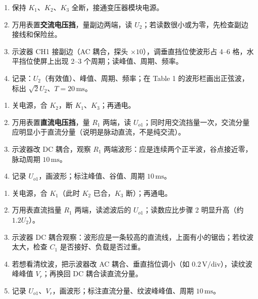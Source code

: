 \documentclass[11pt]{ctexart}
\let\origsubhdr\subhdr
\renewcommand{\subhdr}[1]{\needspace{3\baselineskip}\origsubhdr{#1}}
\begin{document}

\begin{enumerate}
  \item 保持 $K_1$、$K_2$、$K_3$ 全断，接通变压器模块电源。
  \item 万用表置\textbf{交流电压挡}，量副边两端，读 $U_2$；若读数很小或为零，先检查副边接线和保险丝。
  \item 示波器 CH1 接副边（AC 耦合，探头 $\times10$），调垂直挡位使波形占 4--6 格，水平挡位使屏上出现 2--3 个周期；读峰值、周期、频率。
  \item 记录：$U_2$（有效值）、峰值、周期、频率；在 Table 1 的波形栏画出正弦波，标出 $\sqrt2U_2$、$T=20\,\mathrm{ms}$。
\end{enumerate}


\begin{enumerate}
  \item 关电源，合 $K_2$，断 $K_1$、$K_3$；再通电。
  \item 万用表置\textbf{直流电压挡}，量 $R_1$ 两端，读 $U_{o1}$；同时用交流挡量一次，交流分量应明显小于直流分量（说明是脉动直流，不是纯交流）。
  \item 示波器改 DC 耦合，观察 $R_1$ 两端波形：应是连续两个正半波，谷点接近零，脉动周期 $10\,\mathrm{ms}$。
  \item 记录 $U_{o1}$，画波形；标注峰值、谷值、周期 $10\,\mathrm{ms}$。
\end{enumerate}


\begin{enumerate}
  \item 关电源，合 $K_1$（此时 $K_2$ 已合，$K_3$ 断）；再通电。
  \item 万用表直流挡量 $R_1$ 两端，读滤波后的 $U_{o1}$；读数应比步骤 2 明显升高（约 $1.2U_2$）。
  \item 示波器 DC 耦合观察：波形应是一条较高的直流线，上面有小的锯齿；若纹波太大，检查 $C_1$ 是否接好、负载是否过重。
  \item 若想看清纹波，把示波器改 AC 耦合、垂直挡位调小（如 $0.2\,\mathrm{V/div}$），读纹波峰峰值 $V_r$；再换回 DC 耦合读直流分量。
  \item 记录 $U_{o1}$、$V_r$，画波形；标注直流分量、纹波峰峰值、周期 $10\,\mathrm{ms}$。
\end{enumerate}

\end{document}
